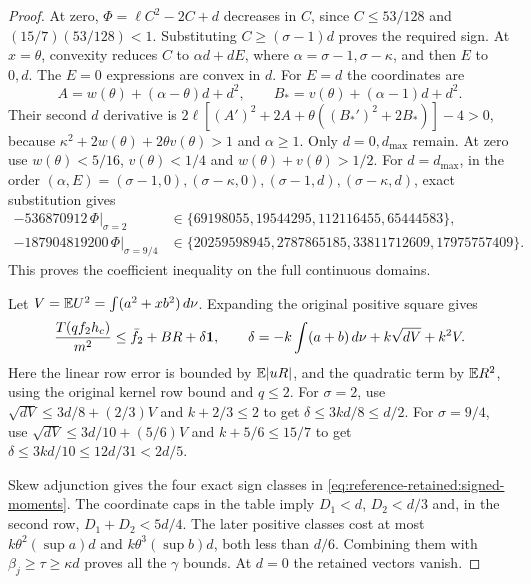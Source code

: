 \begin{proof}
At zero, $\Phi=\ell C^2-2C+d$ decreases in $C$, since
$C\le53/128$ and $(15/7)(53/128)<1$.
Substituting $C\ge(\sigma-1)d$ proves the required sign.
At $x=\theta$, convexity reduces $C$ to
$\alpha d+dE$, where $\alpha=\sigma-1,\sigma-\kappa$, and then
$E$ to $0,d$. The $E=0$ expressions are convex in $d$.
For $E=d$ the coordinates are
\[
 A=w(\theta)+(\alpha-\theta)d+d^2,\qquad
 B_*=v(\theta)+(\alpha-1)d+d^2.
\]
Their second $d$ derivative is
$2\ell[(A')^2+2A+\theta((B_*')^2+2B_*)]-4>0$, because
$\kappa^2+2w(\theta)+2\theta v(\theta)>1$ and $\alpha\ge1$.
Only $d=0,d_{\max}$ remain. At zero use
$w(\theta)<5/16$, $v(\theta)<1/4$ and
$w(\theta)+v(\theta)>1/2$.
For $d=d_{\max}$, in the order
$(\alpha,E)=(\sigma-1,0),(\sigma-\kappa,0),
(\sigma-1,d),(\sigma-\kappa,d)$, exact substitution gives
\[
 \begin{aligned}
 -536870912\,\Phi\big|_{\sigma=2}
   &\in\{69198055,19544295,112116455,65444583\},\\
 -187904819200\,\Phi\big|_{\sigma=9/4}
   &\in\{20259598945,2787865185,33811712609,17975757409\}.
 \end{aligned}
\]
This proves the coefficient inequality on the full continuous domains.

Let $V=\mathbb E U^2=\int(a^2+xb^2)\,d\nu$.
Expanding the original positive square gives
\[
 \frac{T(qf_2h_c)}{m^2}
 \le\bar f_2+BR+\delta\mathbf1,\qquad
 \delta=-k\int(a+b)\,d\nu+k\sqrt{dV}+k^2V.
\]
Here the linear row error is bounded by $\mathbb E|uR|$, and the quadratic
term by $\mathbb E R^2$, using the original kernel row bound and $q\le2$.
For $\sigma=2$, use
$\sqrt{dV}\le3d/8+(2/3)V$ and $k+2/3\le2$ to get
$\delta\le3kd/8\le d/2$.
For $\sigma=9/4$, use
$\sqrt{dV}\le3d/10+(5/6)V$ and $k+5/6\le15/7$ to get
$\delta\le3kd/10\le12d/31<2d/5$.

Skew adjunction gives the four exact sign classes in
\eqref{eq:reference-retained:signed-moments}. The coordinate caps in
the table imply $D_1<d$, $D_2<d/3$ and, in the second row,
$D_1+D_2<5d/4$. The later positive classes cost at most
$k\theta^2(\sup a)d$ and $k\theta^3(\sup b)d$, both less than $d/6$.
Combining them with $\beta_j\ge\tau\ge\kappa d$ proves all the
$\gamma$ bounds. At $d=0$ the retained vectors vanish.
\end{proof}

